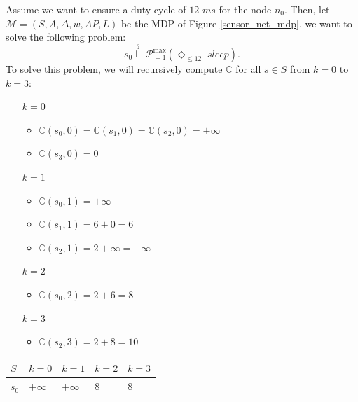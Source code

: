 \begin{example}
Assume we want to ensure a duty cycle of $12$ $ms$ for the node $n_0$. Then, let $\mathcal{M}=(S, A, \Delta, w, AP, L)$ be the MDP of Figure \ref{sensor_net_mdp}, we want to solve the following \SPG{} problem:
\[
  s_0 \overset{?}{\models} \, \mathcal{P}^{\max}_{=1}(\Diamond_{\leq 12} \; \textit{sleep}).
\]
To solve this problem, we will recursively compute $\mathbb{C}$ for all $s \in S$ from $k=0$ to $k=3$:\\[0.7em]
\begin{minipage}{0.5\linewidth}
    \begin{itemize}
      \item[$k=0$] \begin{itemize}
[label=\raisebox{0.25ex}{\tiny$\bullet$}]        \item $\mathbb{C}(s_0, 0) = \mathbb{C}(s_1, 0) = \mathbb{C}(s_2, 0) = +\infty$
        \item $\mathbb{C}(s_3, 0) = 0$
      \end{itemize}
      \item[$k=1$]
        \begin{itemize}
[label=\raisebox{0.25ex}{\tiny$\bullet$}]          \item $\mathbb{C}(s_0, 1) = +\infty$
          \item $\mathbb{C}(s_1, 1) = 6 + 0 = 6$
          \item $\mathbb{C}(s_2, 1) = 2 + \infty = +\infty$
        \end{itemize}
      \item[$k=2$]
        \begin{itemize}
[label=\raisebox{0.25ex}{\tiny$\bullet$}]          \item $\mathbb{C}(s_0, 2) = 2 + 6 = 8$
        \end{itemize}
      \item[$k=3$]
        \begin{itemize}
[label=\raisebox{0.25ex}{\tiny$\bullet$}]          \item $\mathbb{C}(s_2, 3) = 2 + 8 = 10$
        \end{itemize}
    \end{itemize}
\end{minipage}
\begin{minipage}{0.5\linewidth}
\centering
\begin{tabular}{l|llll}
$S$ & $k=0$     & $k=1$     & $k=2$     & $k=3$ \\ \hline
$s_0$  & $+\infty$ & $+\infty$ & 8         & 8     \\

\end{tabular}
\end{minipage}
\end{example}
